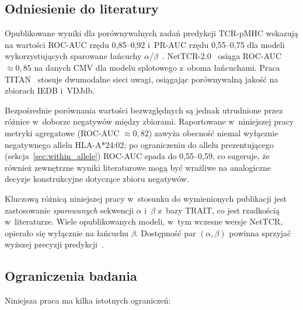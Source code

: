 \documentclass{SGGW-thesis}
\begin{document}
\subsection{Odniesienie do literatury}

Opublikowane wyniki dla porównywalnych zadań predykcji TCR-pMHC wskazują na wartości
ROC-AUC rzędu 0{,}85--0{,}92 i~PR-AUC rzędu 0{,}55--0{,}75 dla modeli wykorzystujących sparowane
łańcuchy $\alpha$/$\beta$~\cite{montemurro2022,springer2020,weber2021}. NetTCR-2.0~\cite{montemurro2022}
osiąga ROC-AUC $\approx 0{,}85$ na danych CMV dla modelu splotowego z~oboma łańcuchami. Praca TITAN~\cite{weber2021}
stosuje dwumodalne sieci uwagi, osiągając porównywalną jakość na zbiorach IEDB i~VDJdb.

Bezpośrednie porównania wartości bezwzględnych są jednak utrudnione przez różnice
w~doborze negatywów między zbiorami. Raportowane w~niniejszej pracy metryki agregatowe
(ROC-AUC ${\approx}0{,}82$) zawyża obecność niemal wyłącznie negatywnego allelu HLA-A*24:02; po
ograniczeniu do allelu prezentującego (sekcja~\ref{sec:within_allele}) ROC-AUC spada do
0{,}55--0{,}59, co sugeruje, że również zewnętrzne wyniki literaturowe mogą być wrażliwe
na analogiczne decyzje konstrukcyjne dotyczące zbioru negatywów.

Kluczową różnicą niniejszej pracy w~stosunku do wymienionych publikacji jest zastosowanie \textit{sparowanych}
sekwencji $\alpha$ i~$\beta$ z~bazy TRAIT, co jest rzadkością w~literaturze. Wiele opublikowanych
modeli, w~tym wczesne wersje NetTCR, opierało się wyłącznie na łańcuchu $\beta$. Dostępność par
$(\alpha, \beta)$ powinna sprzyjać wyższej precyzji predykcji~\cite{montemurro2022}.

\subsection{Ograniczenia badania}
\label{sec:limitations}

Niniejsza praca ma kilka istotnych ograniczeń:
\end{document}
